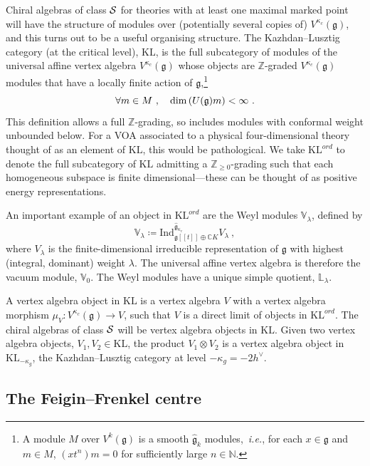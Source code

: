 \documentclass[a4paper]{article}
\def\IC{\mathbb{C}}
\def\IN{\mathbb{N}}
\def\IV{\mathbb{V}}
\def\IZ{\mathbb{Z}}
\def\IL{\mathbb{L}}
\def\SS{{\cal S}}
\def\dim{{\rm dim}}
\def\gf{\mathfrak{g}}
\def \ie{{\it i.e.}}
\def \KL{\mathrm{KL}}
\begin{document}
Chiral algebras of class $\SS$ for theories with at least one maximal marked point will have the structure of modules over (potentially several copies of) $V^{\kappa_c}(\gf)$, and this turns out to be a useful organising structure. The Kazhdan--Lusztig category (at the critical level), $\KL$, is the full subcategory of modules of the universal affine vertex algebra $V^{\kappa_c}(\gf)$ whose objects are $\IZ$-graded $V^{\kappa_c}(\gf)$ modules that have a locally finite action of $\gf$,\footnote{A module $M$ over $V^{k}(\gf)$ is a smooth $\hat{\gf}_{k}$ modules,~\ie, for each $x\in\gf$ and $m\in M$, $(xt^n)m =0$ for sufficiently large $n\in\IN$.
}
\begin{equation}
	\forall m\in M~,\quad \dim\left(U(\gf)m\right)<\infty~.
\end{equation}
This definition allows a full $\IZ$-grading, so includes modules with conformal weight unbounded below. For a VOA associated to a physical four-dimensional theory thought of as an element of $\KL$, this would be pathological. We take $\KL^{ord}$ to denote the full subcategory of $\KL$ admitting a $\IZ_{\geqslant0}$-grading such that each homogeneous subspace is finite dimensional---these can be thought of as positive energy representations.

An important example of an object in $\KL^{ord}$ are the Weyl modules $\IV_\lambda$, defined by
\begin{equation}
	\mathbb{V}_\lambda \coloneqq \mathrm{Ind}_{\gf [\![t]\!]\oplus \IC K}^{\hat{\gf}_{\kappa_c}} V_\lambda~,
\end{equation}
where $V_\lambda$ is the finite-dimensional irreducible representation of $\gf$ with highest (integral, dominant) weight $\lambda$. The universal affine vertex algebra is therefore the vacuum module, $\IV_0$. The Weyl modules have a unique simple quotient, $\IL_{\lambda}$.

A vertex algebra object in $\KL$ is a vertex algebra $V$ with a vertex algebra morphism $\mu_V: V^{\kappa_c}(\gf)\rightarrow V$, such that $V$ is a direct limit of objects in $\KL^{ord}$. The chiral algebras of class $\SS$ will be vertex algebra objects in $\KL$. Given two vertex algebra objects, $V_1,V_2\in\KL$, the product $V_1\otimes V_2$ is a vertex algebra object in $\KL_{-\kappa_g}$, the Kazhdan--Lusztig category at level $-\kappa_g=-2h^\vee$.

\subsection{The Feigin--Frenkel centre}
\label{subsec:ff_centre}
\end{document}

